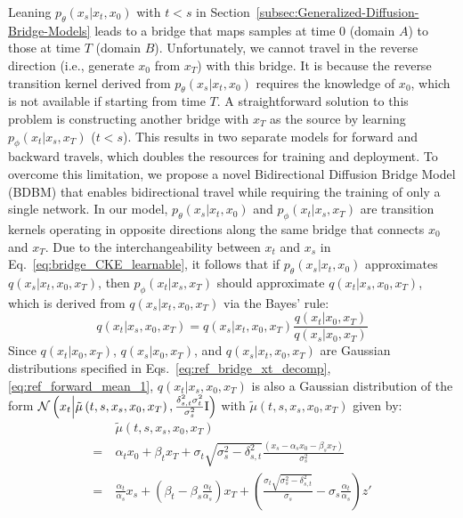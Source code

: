 Leaning $p_{\theta}\left(x_{s}|x_{t},x_{0}\right)$ with $t<s$ in
Section~\ref{subsec:Generalized-Diffusion-Bridge-Models} leads to
a bridge that maps samples at time $0$ (domain $A$) to those at
time $T$ (domain $B$). Unfortunately, we cannot travel in the reverse
direction (i.e., generate $x_{0}$ from $x_{T}$) with this bridge.
It is because the reverse transition kernel derived from $p_{\theta}\left(x_{s}|x_{t},x_{0}\right)$
requires the knowledge of $x_{0}$, which is not available if starting
from time $T$. A straightforward solution to this problem is constructing
another bridge with $x_{T}$ as the source by learning $p_{\phi}\left(x_{t}|x_{s},x_{T}\right)$
($t<s$). This results in two separate models for forward and backward
travels, which doubles the resources for training and deployment.
To overcome this limitation, we propose a novel Bidirectional Diffusion
Bridge Model (BDBM) that enables bidirectional travel while requiring
the training of only a single network. In our model, $p_{\theta}\left(x_{s}|x_{t},x_{0}\right)$
and $p_{\phi}\left(x_{t}|x_{s},x_{T}\right)$ are transition kernels
operating in opposite directions along the same bridge that connects
$x_{0}$ and $x_{T}$. Due to the interchangeability between $x_{t}$
and $x_{s}$ in Eq.~\ref{eq:bridge_CKE_learnable}, it follows that
if $p_{\theta}\left(x_{s}|x_{t},x_{0}\right)$ approximates $q\left(x_{s}|x_{t},x_{0},x_{T}\right)$,
then $p_{\phi}\left(x_{t}|x_{s},x_{T}\right)$ should approximate
$q\left(x_{t}|x_{s},x_{0},x_{T}\right)$, which is derived from $q\left(x_{s}|x_{t},x_{0},x_{T}\right)$
via the Bayes' rule:
\begin{equation}
q\left(x_{t}|x_{s},x_{0},x_{T}\right)=q\left(x_{s}|x_{t},x_{0},x_{T}\right)\frac{q\left(x_{t}|x_{0},x_{T}\right)}{q\left(x_{s}|x_{0},x_{T}\right)}\label{eq:Bayes_rule_bridge}
\end{equation}
Since $q\left(x_{t}|x_{0},x_{T}\right)$, $q\left(x_{s}|x_{0},x_{T}\right)$,
and $q\left(x_{s}|x_{t},x_{0},x_{T}\right)$ are Gaussian distributions
specified in Eqs.~\ref{eq:ref_bridge_xt_decomp}, \ref{eq:ref_forward_mean_1},
$q\left(x_{t}|x_{s},x_{0},x_{T}\right)$ is also a Gaussian distribution
of the form $\mathcal{N}\left(x_{t}\Big|\tilde{\mu}\left(t,s,x_{s},x_{0},x_{T}\right),\frac{\delta_{s,t}^{2}\sigma_{t}^{2}}{\sigma_{s}^{2}}\mathrm{I}\right)$
with $\tilde{\mu}\left(t,s,x_{s},x_{0},x_{T}\right)$ given by:
\begin{align}
 & \tilde{\mu}\left(t,s,x_{s},x_{0},x_{T}\right)\nonumber \\
=\  & \alpha_{t}x_{0}+\beta_{t}x_{T}+\sigma_{t}\sqrt{\sigma_{s}^{2}-\delta_{s,t}^{2}}\frac{\left(x_{s}-\alpha_{s}x_{0}-\beta_{s}x_{T}\right)}{\sigma_{s}^{2}}\label{eq:ref_backward_mean_1}\\
=\  & \frac{\alpha_{t}}{\alpha_{s}}x_{s}+\left(\beta_{t}-\beta_{s}\frac{\alpha_{t}}{\alpha_{s}}\right)x_{T}+\left(\frac{\sigma_{t}\sqrt{\sigma_{s}^{2}-\delta_{s,t}^{2}}}{\sigma_{s}}-\sigma_{s}\frac{\alpha_{t}}{\alpha_{s}}\right)z'\label{eq:ref_backward_mean_2}
\end{align}
